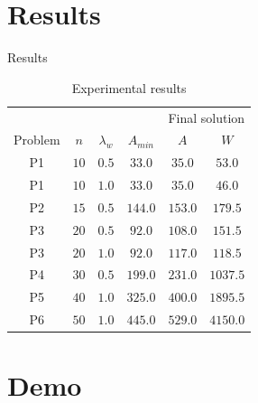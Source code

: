 \documentclass[xcolor=pdftex,dvipsnames,table]{beamer}
\begin{document}

\section{Results}

\begin{frame}{Results}
  \begin{table}[]
  \begin{tabular}{cccccc}
          &      &             &            & \multicolumn{2}{c}{Final solution} \\ \cline{5-6}
  Problem & $n$  & $\lambda_w$ & $A_{min}$  & $A$              & $W$             \\ \hline
     P1   & $10$ & $0.5$       & $33.0$     & $35.0$           & $53.0$          \\
     P1   & $10$ & $1.0$       & $33.0$     & $35.0$           & $46.0$          \\
     P2   & $15$ & $0.5$       & $144.0$    & $153.0$          & $179.5$         \\
     P3   & $20$ & $0.5$       & $92.0$     & $108.0$          & $151.5$         \\
     P3   & $20$ & $1.0$       & $92.0$     & $117.0$          & $118.5$         \\
     P4   & $30$ & $0.5$       & $199.0$    & $231.0$          & $1037.5$        \\
     P5   & $40$ & $1.0$       & $325.0$    & $400.0$          & $1895.5$        \\
     P6   & $50$ & $1.0$       & $445.0$    & $529.0$          & $4150.0$        \\
  \end{tabular}
  \caption{Experimental results}
  \end{table}
\end{frame}

\section{Demo}

\end{document}
